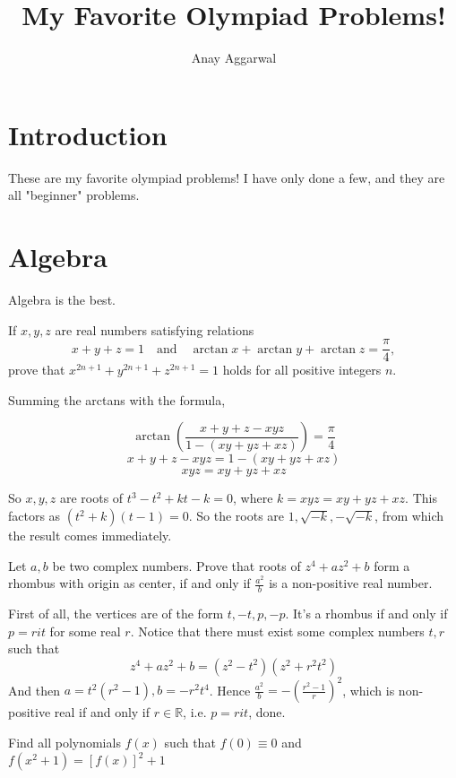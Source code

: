 \documentclass[11pt]{scrartcl}
\title{My Favorite Olympiad Problems!}
\author{Anay Aggarwal}
\begin{document}
\maketitle
\section{Introduction}
These are my favorite olympiad problems! I have only done a few, and they are all "beginner" problems.
\section{Algebra}
Algebra is the best.
\begin{example}
  [IMO SL, 1967]
  If $x,y,z$ are real numbers satisfying relations
  \[x+y+z = 1 \quad \textrm{and} \quad \arctan x + \arctan y + \arctan z = \frac{\pi}{4},\]
  prove that $x^{2n+1} + y^{2n+1} + z^{2n+1} = 1$ holds for all positive integers $n$.
\end{example}
\begin{soln}
  Summing the arctans with the formula,

  $$\arctan\left(\frac{x+y+z-xyz}{1-(xy+yz+xz)}\right)=\frac{\pi}{4}$$
  $$x+y+z-xyz=1-(xy+yz+xz)$$
  $$xyz=xy+yz+xz$$

  So $x,y,z$ are roots of $t^3-t^2+kt-k=0$, where $k=xyz=xy+yz+xz$. This factors
  as $(t^2+k)(t-1)=0$. So the roots are $1, \sqrt{-k}, -\sqrt{-k}$, from which the
  result comes immediately.

\end{soln}
\begin{example}
  Let $ a,b$ be two complex numbers. Prove that roots of $ z^{4}+az^{2}+b$ form a rhombus with origin as center, if and only if $ \frac{a^{2}}{b}$ is a non-positive real number.
\end{example}
\begin{soln}
  First of all, the vertices are of the form $t, -t, p, -p$. It's a rhombus if and only if $p=rit$ for some real $r$.
  Notice that there must exist some complex numbers $t, r$ such that
  $$z^4+az^2+b=(z^2-t^2)(z^2+r^2t^2)$$
  And then $a=t^2(r^2-1), b=-r^2t^4$. Hence $\frac{a^2}{b}=-\left(\frac{r^2-1}{r}\right)^2$, which is non-positive real
  if and only if $r\in\mathbb{R}$, i.e. $p=rit$, done.

\end{soln}
\begin{example}
  [Putnam 1971]
  Find all polynomials $f(x)$ such that $f(0)\equiv 0$ and $f(x^2+1)=[f(x)]^2+1$
\end{example}
\end{document}
